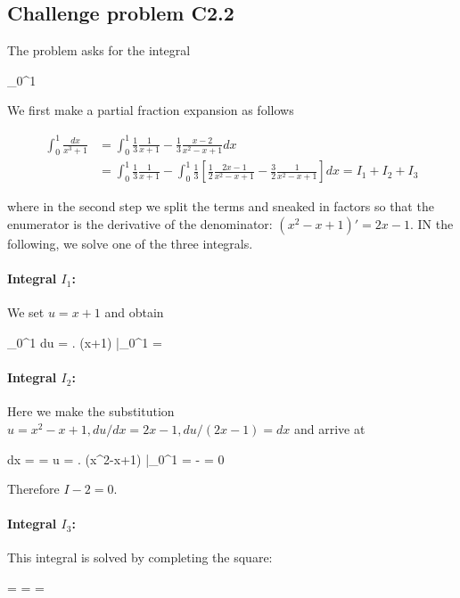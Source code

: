
\subsection{Challenge problem C2.2}

The problem asks for the integral

\bee
\int_0^1 
\eee

We first make a partial fraction expansion as follows

\begin{align*}
\int_0^1 \frac{dx}{x^3+1} &= \int_0^1 \frac{1}{3}\frac{1}{x+1} - \frac{1}{3}\frac{x-2}{x^2-x+1} dx \\ &= \int_0^1 \frac{1}{3}\frac{1}{x+1} - \int_0^1 \frac{1}{3} \left[ \frac{1}{2} \frac{2x-1}{x^2-x+1} - \frac{3}{2} \frac{1}{x^2-x+1} \right] dx = I_1 + I_2 + I_3
\end{align*}

where in the second step we split the terms and sneaked in factors so that the enumerator is the derivative of the denominator: $(x^2 - x+1)' = 2x-1$. IN the following, we solve one of the three integrals.

\paragraph{Integral $I_1$:} We set $u=x+1$ and obtain

\bee
\int_0^1  du =  \left. \ln (x+1) \right|_0^1 =  
\eee

\paragraph{Integral $I_2$:} Here we make the substitution $u = x^2-x+1, du/dx = 2x-1, du/(2x-1) = dx$ and arrive at

\bee
\int {} dx = \int {}  = \ln u = \left. \ln(x^2-x+1) \right|_0^1 =  -  = 0
\eee

Therefore $I-2 = 0$.

\paragraph{Integral $I_3$:} This integral is solved by completing the square:

\bee
\int {} = \int {} = \int {} = \int {}
\eee

